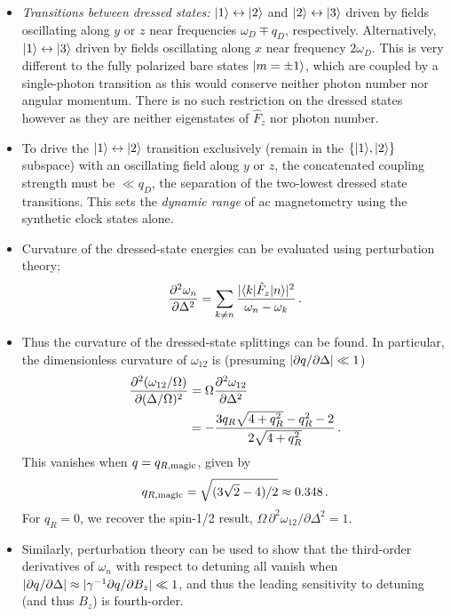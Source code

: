 \documentclass[aps,prl,reprint,superscriptaddress,floatfix]{revtex4-1}
\begin{document}
\begin{itemize}
    \item[\checkmark] \textit{Transitions between dressed states:} $\vert 1 \rangle  \leftrightarrow \vert 2 \rangle $ and $\vert 2 \rangle  \leftrightarrow \vert 3 \rangle $ driven by fields oscillating along $y$ or $z$ near frequencies $\omega_D \mp q_D$, respectively.
    Alternatively, $\vert 1 \rangle  \leftrightarrow \vert 3 \rangle $ driven by fields oscillating along $x$ near frequency $2\omega_D$.
    This is very different to the fully polarized bare states $\vert m=\pm 1 \rangle $, which are coupled by a single-photon transition as this would conserve neither photon number nor angular momentum.
    There is no such restriction on the dressed states however as they are neither eigenstates of $\hat{F}_z$ nor photon number.
    \item To drive the $\vert 1 \rangle  \leftrightarrow \vert 2 \rangle $ transition exclusively (remain in the $\{\vert 1 \rangle , \vert 2 \rangle \}$ subspace) with an oscillating field along $y$ or $z$, the concatenated coupling strength must be $\ll q_D$, the separation of the two-lowest dressed state transitions. This sets the \textit{dynamic range} of ac magnetometry using the synthetic clock states alone.
    \item[\checkmark] Curvature of the dressed-state energies can be evaluated using perturbation theory;
    \[
    \frac{\partial ^2\omega_n}{\partial \Delta^2} = \sum_{k \neq n} \frac{\vert \langle k \vert  \hat{F}_z \vert n \rangle  \vert ^2}{\omega_n - \omega_k} \, .
    \]
    \item[\checkmark] Thus the curvature of the dressed-state splittings can be found. In particular, the dimensionless curvature of $\omega_{12}$ is (presuming $\vert \partial q / \partial \Delta \vert  \ll 1$) 
    \begin{align*}
    \frac{\partial ^2(\omega_{12}/\Omega)}{\partial (\Delta/\Omega)^2} &= \Omega \frac{\partial ^2\omega_{12}}{\partial \Delta^2} \\ &= -\frac{3 q_R \sqrt{4 + q_R^2} - q_R^2 - 2}{2 \sqrt{4 + q_R^2}} \, .
    \end{align*}
    This vanishes when $q = q_{R,\text{magic}}$, given by
    \[
    q_{R,\text{magic}} = \sqrt{(3\sqrt{2} - 4)/2} \approx 0.348 \, .
    \]
    For $q_R = 0$, we recover the spin-1/2 result, $\Omega\, \partial^2\omega_{12}/\partial \Delta^2 = 1$.
    \item[\checkmark] Similarly, perturbation theory can be used to show that the third-order derivatives of $\omega_n$ with respect to detuning all vanish when $\vert \partial q / \partial \Delta \vert  \approx \vert \gamma^{-1} \partial q / \partial B_z \vert  \ll 1$, and thus the leading sensitivity to detuning (and thus $B_z$) is fourth-order.

\end{itemize}
\end{document}
